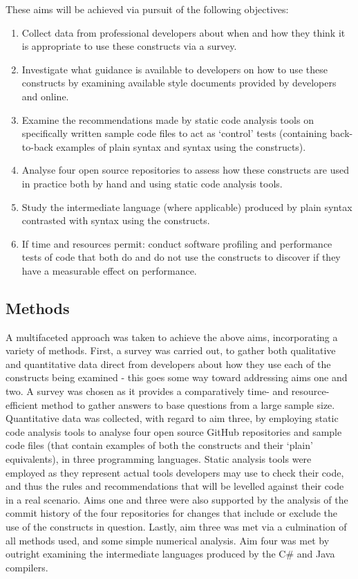 \documentclass{article}
\begin{document}
        These aims will be achieved via pursuit of the following objectives:
        \begin{enumerate}
            \item Collect data from professional developers about when and how they think it is appropriate to use these constructs via a survey.
            \item Investigate what guidance is available to developers on how to use these constructs by examining available style documents provided by developers and online.
            \item Examine the recommendations made by static code analysis tools on specifically written sample code files to act as `control' tests (containing back-to-back examples of plain syntax and syntax using the constructs).
            \item Analyse four open source repositories to assess how these constructs are used in practice both by hand and using static code analysis tools.
            \item Study the intermediate language (where applicable) produced by plain syntax contrasted with syntax using the constructs.
            \item If time and resources permit: conduct software profiling and performance tests of code that both do and do not use the constructs to discover if they have a measurable effect on performance.
        \end{enumerate}

    \subsection{Methods}
        A multifaceted approach was taken to achieve the above aims, incorporating a variety of methods. First, a survey was carried out, to gather both qualitative and quantitative data direct from developers about how they use each of the constructs being examined - this goes some way toward addressing aims one and two. A survey was chosen as it provides a comparatively time- and resource-efficient method to gather answers to base questions from a large sample size.
        Quantitative data was collected, with regard to aim three, by employing static code analysis tools to analyse four open source GitHub repositories and sample code files (that contain examples of both the constructs and their `plain' equivalents), in three programming languages. Static analysis tools were employed as they represent actual tools developers may use to check their code, and thus the rules and recommendations that will be levelled against their code in a real scenario.
        Aims one and three were also supported by the analysis of the commit history of the four repositories for changes that include or exclude the use of the constructs in question. Lastly, aim three was met via a culmination of all methods used, and some simple numerical analysis.
        Aim four was met by outright examining the intermediate languages produced by the C\# and Java compilers.
\end{document}
